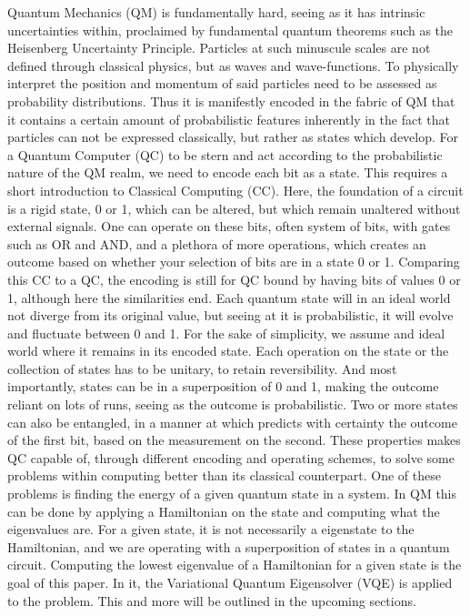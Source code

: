 Quantum Mechanics (QM) is fundamentally hard, seeing as it has intrinsic uncertainties within, proclaimed by fundamental quantum theorems such as the Heisenberg Uncertainty Principle. Particles at such minuscule scales are not defined through classical physics, but as waves and wave-functions. To physically interpret the position and momentum of said particles need to be assessed as probability distributions. Thus it is manifestly encoded in the fabric of QM that it contains a certain amount of probabilistic features inherently in the fact that particles can not be expressed classically, but rather as states which develop. 
\newline\newline
For a Quantum Computer (QC) to be stern and act according to the probabilistic nature of the QM realm, we need to encode each bit as a state. This requires a short introduction to Classical Computing (CC). Here, the foundation of a circuit is a rigid state, 0 or 1, which can be altered, but which remain unaltered without external signals. One can operate on these bits, often system of bits, with gates such as OR and AND, and a plethora of more operations, which creates an outcome based on whether your selection of bits are in a state 0 or 1. 
\newline\newline
Comparing this CC to a QC, the encoding is still for QC bound by having bits of values 0 or 1, although here the similarities end. Each quantum state will in an ideal world not diverge from its original value, but seeing at it is probabilistic, it will evolve and fluctuate between 0 and 1. For the sake of simplicity, we assume and ideal world where it remains in its encoded state. Each operation on the state or the collection of states has to be unitary, to retain reversibility. And most importantly, states can be in a superposition of 0 and 1, making the outcome reliant on lots of runs, seeing as the outcome is probabilistic. Two or more states can also be entangled, in a manner at which predicts with certainty the outcome of the first bit, based on the measurement on the second. These properties makes QC capable of, through different encoding and operating schemes, to solve some problems within computing better than its classical counterpart. 
\newline\newline
One of these problems is finding the energy of a given quantum state in a system. In QM this can be done by applying a Hamiltonian on the state and computing what the eigenvalues are. For a given state, it is not necessarily a eigenstate to the Hamiltonian, and we are operating with a superposition of states in a quantum circuit. Computing the lowest eigenvalue of a Hamiltonian for a given state is the goal of this paper. In it, the Variational Quantum Eigensolver (VQE) is applied to the problem. This and more will be outlined in the upcoming sections.
